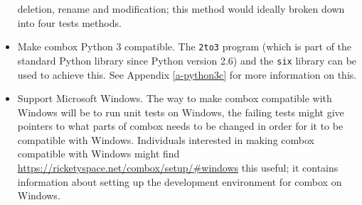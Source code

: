 \begin{itemize}
  deletion, rename and modification; this method would ideally broken
  down into four tests methods.
\item Make combox Python 3 compatible. The \verb+2to3+ program (which
  is part of the standard Python library since Python version 2.6) and
  the \verb+six+ library can be used to achieve this. See Appendix
  \ref{a-python3c} for more information on this.
\item Support Microsoft Windows. The way to make combox compatible
  with Windows will be to run unit tests on Windows, the failing tests
  might give pointers to what parts of combox needs to be changed in
  order for it to be compatible with Windows. Individuals interested
  in making combox compatible with Windows might find
  \url{https://ricketyspace.net/combox/setup/#windows} this useful; it
  contains information about setting up the development environment
  for combox on Windows.
\end{itemize}


